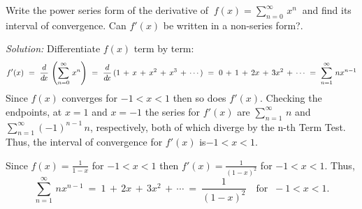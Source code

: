 \begin{exmp}\label{exmp:seriesderivxn}
\noindent Write the power series form of the derivative of
$~f(x) = \displaystyle\sum_{n=0}^{\infty} \,x^n~$ and find its interval of
convergence. Can $f'(x)$ be written in a non-series form?.\vspace{1mm}
\par\noindent\emph{Solution:} Differentiate $f(x)$ term by term:
\[
f'(x) ~=~ \frac{d}{d\!x}\,\left(\sum_{n=0}^{\infty} \,x^n\right) ~=~
\frac{d}{d\!x}\,(1 \,+\, x \,+\, x^2 \,+\, x^3 \,+\, \cdots) ~=~
0 \,+\, 1 \,+\, 2x \,+\, 3x^2 \,+\, \cdots ~=~
\sum_{n=1}^{\infty} \,n x^{n-1}
\]
Since $f(x)$ converges for $-1<x<1$ then so does $f'(x)$. Checking the
endpoints, at $x=1$ and $x=-1$ the series for $f'(x)$ are
$\sum_{n=1}^{\infty}\,n$ and $\sum_{n=1}^{\infty} (-1)^{n-1}\,n$, respectively,
both of which diverge by the n-th Term Test. Thus, the interval of convergence
for $f'(x)$ is$-1<x<1$.\vspace{1mm}

\par\noindent Since $f(x)=\frac{1}{1-x}$ for $-1<x<1$ then
$f'(x)=\frac{1}{(1-x)^2}$ for $-1<x<1$. Thus,
\[
\sum_{n=1}^{\infty} \,n x^{n-1} ~=~ 1 \,+\, 2x \,+\, 3x^2 \,+\, \cdots ~=~
\frac{1}{(1-x)^2} \quad\text{for $~-1<x<1$.}
\]
\end{exmp}
\divider
\vspace{2mm}

\\

